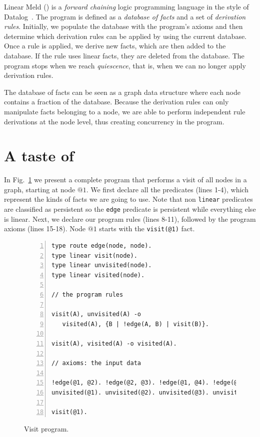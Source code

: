 
Linear Meld (\lang) is a \emph{forward chaining} logic programming language in the style of Datalog~\cite{Ullman:1990:PDK:533142}. The program is defined as a \emph{database of facts} and a set of \emph{derivation rules}.
Initially, we populate the database with the program's axioms and then determine which derivation rules can be applied by using the current database. Once a rule is applied, we derive new facts, which are then added to the database.
If the rule uses linear facts, they are deleted from the database.
The program stops when we reach \emph{quiescence}, that is, when we can no longer
apply derivation rules.

The database of facts can be seen as a graph data structure where each node contains a
fraction of the database.
Because the derivation rules can only manipulate facts belonging to
a node, we are able to perform independent rule derivations at the node level, thus
creating concurrency in the program.

\section{A taste of \lang}

In Fig.~\ref{code:visit} we present a complete \lang program that performs a visit of all nodes
in a graph, starting at node $@1$. We first declare all the predicates (lines 1-4), which represent the kinds of facts we are going to use. Note that non \texttt{linear} predicates are classified as persistent so the \texttt{edge} predicate is persistent while everything else
is linear.
Next, we declare our program rules (lines 8-11), followed by the program axioms (lines 15-18).
Node $@1$ starts with the \texttt{visit(@1)} fact.

\begin{figure}[h!]
\small\begin{Verbatim}[numbers=left]
type route edge(node, node).
type linear visit(node).
type linear unvisited(node).
type linear visited(node).

// the program rules

visit(A), unvisited(A) -o
   visited(A), {B | !edge(A, B) | visit(B)}.

visit(A), visited(A) -o visited(A).

// axioms: the input data

!edge(@1, @2). !edge(@2, @3). !edge(@1, @4). !edge(@2, @4).
unvisited(@1). unvisited(@2). unvisited(@3). unvisited(@4).

visit(@1).
\end{Verbatim}
  \caption{Visit program.}
  \label{code:visit}
\end{figure}
\normalsize

